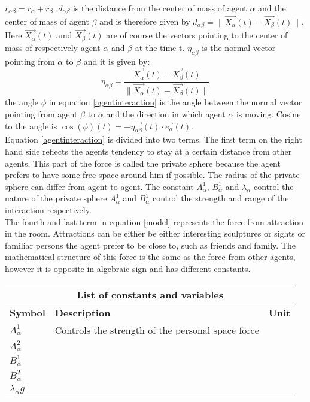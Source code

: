 \documentclass[12pt,a4paper]{report} %
\begin{document}
$r_{\alpha \beta} = r_{\alpha} + r_{\beta}$. $d_{\alpha \beta}$ is the distance from the center of mass of agent $\alpha$ and the center of mass of agent $\beta$ and is therefore given by $d_{\alpha \beta} = \|\vec{X_{\alpha}}\left( t \right) - \vec{X_{\beta}}\left( t \right) \|$. Here $\vec{X_{\alpha}}\left( t \right)$ amd $\vec{X_{\beta}}\left( t \right)$ are of course the vectors pointing to the center of mass of respectively agent $\alpha$ and $\beta$ at the time t. $\eta_{\alpha \beta}$ is the normal vector pointing from $\alpha$ to $\beta$ and it is given by:
\begin{equation}
\eta_{\alpha \beta} = \frac{\vec{X_{\alpha}}\left( t \right) - \vec{X_{\beta}}\left( t \right)}{\|\vec{X_{\alpha}}\left( t \right) - \vec{X_{\beta}}\left( t \right) \|}
\end{equation}
the angle $\phi$ in equation \ref{agentinteraction} is the angle between the normal vector pointing from agent $\beta$ to $\alpha$ and the direction in which agent $\alpha$ is moving. Cosine to the angle is $\cos \left( \phi \right)\left( t \right) = - \vec{\eta_{\alpha \beta}}\left( t \right) \cdot \vec{e_{\alpha}}\left( t \right)$.\\
Equation \ref{agentinteraction} is divided into two terms. The first term on the right hand side reflects the agents tendency to stay at a certain distance from other agents. This part of the force is called the private sphere because the agent prefers to have some free space around him if possible. The radius of the private sphere can differ from agent to agent. The constant $A_{\alpha}^{1}$, $B_{\alpha}^{1}$ and $\lambda_{\alpha}$ control the nature of the private sphere $A_{\alpha}^1$ and $B_{\alpha}^1$ control the strength and range of the interaction respectively.\\
The fourth and last term in equation \ref{model} represents the force from attraction in the room. Attractions can be either be either interesting sculptures or sights or familiar persons the agent prefer to be close to, such as friends and family. The mathematical structure of this force is the same as the force from other agents, however it is opposite in algebraic sign and has different constants. 
\begin{center}
\begin{tabular}{lll}
\hline
\multicolumn{3}{|c|}{List of constants and variables}\\
\hline
\small{\textbf{Symbol}} & \small{\textbf{Description}} & \small{\textbf{Unit}}\\
\hline
$A_{\alpha}^{1}$ & \small{Controls the strength of the personal space force}\\
\hline
$A_{\alpha}^{2}$ &  & \\
\hline
$B_{\alpha}^{1}$ &  & \\
\hline
$B_{\alpha}^{2}$ &  & \\
\hline
$\lambda_{\alpha}g$ &  & \\
\hline
\end{tabular}
\end{center}
\end{document}
